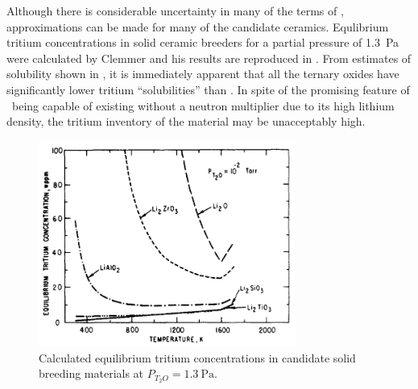 \documentclass[11pt]{report} %
\newcommand{\lio}{\ce{Li2O}}
\begin{document}
Although there is considerable uncertainty in many of the terms of , approximations can be made for many of the candidate ceramics. Equlibrium tritium concentrations in solid ceramic breeders for a  partial pressure of \SI{1.3}{\pascal} were calculated by Clemmer and his results are reproduced in .\cite{Clemmer1980} From estimates of solubility shown in , it is immediately apparent that all the ternary oxides have significantly lower tritium ``solubilities'' than \lio. In spite of the promising feature of \lio~being capable of existing without a neutron multiplier due to its high lithium density, the tritium inventory of the material may be unacceptably high.

\begin{figure}[ht]
	\centering
	\includegraphics[width=0.75\textwidth]{images/solubility} 
	\caption{Calculated equilibrium tritium concentrations in candidate solid breeding materials at $P_{T_2O} = \SI{1.3}{\pascal}$.}
	\label{fig:solubility}
\end{figure}



\end{document}

